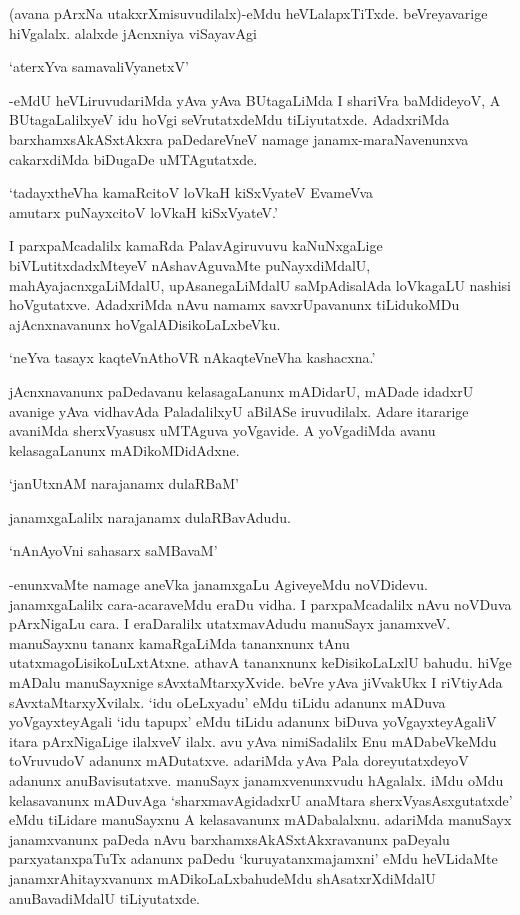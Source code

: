 (avana pArxNa utakxrXmisuvudilalx)-eMdu heVLalapxTiTxde. beVreyavarige hiVgalalx. alalxde jAcnxniya viSayavAgi

\begin{shloka}
`aterxYva samavaliVyanetxV'
\end{shloka}

-eMdU heVLiruvudariMda yAva yAva BUtagaLiMda I shariVra baMdideyoV, A BUtagaLalilxyeV idu hoVgi seVrutatxdeMdu tiLiyutatxde. AdadxriMda barxhamxsAkASxtAkxra paDedareVneV namage janamx-maraNavenunxva cakarxdiMda biDugaDe uMTAgutatxde.

\begin{shloka}
`tadayxtheVha kamaRcitoV loVkaH kiSxVyateV EvameVva\\
amutarx puNayxcitoV loVkaH kiSxVyateV.'
\end{shloka}

I parxpaMcadalilx kamaRda PalavAgiruvuvu kaNuNxgaLige biVLutitxdadxMteyeV nAshavAguvaMte puNayxdiMdalU, mahAyajacnxgaLiMdalU, upAsanegaLiMdalU saMpAdisalAda loVkagaLU nashisi hoVgutatxve. AdadxriMda nAvu namamx savxrUpavanunx tiLidukoMDu ajAcnxnavanunx hoVgalADisikoLaLxbeVku.

\begin{shloka}
`neYva tasayx kaqteVnAthoVR nAkaqteVneVha kashacxna.'
\end{shloka}

jAcnxnavanunx paDedavanu kelasagaLanunx mADidarU, mADade idadxrU avanige yAva vidhavAda PaladalilxyU aBilASe iruvudilalx. Adare itararige avaniMda sherxVyasusx uMTAguva yoVgavide. A yoVgadiMda avanu kelasagaLanunx mADikoMDidAdxne.

\begin{shloka}
`janUtxnAM narajanamx dulaRBaM'
\end{shloka}

janamxgaLalilx narajanamx dulaRBavAdudu.

\begin{shloka}
`nAnAyoVni sahasarx saMBavaM'
\end{shloka}

-enunxvaMte namage aneVka janamxgaLu AgiveyeMdu noVDidevu. janamxgaLalilx cara-acaraveMdu eraDu vidha. I parxpaMcadalilx nAvu noVDuva pArxNigaLu cara. I eraDaralilx utatxmavAdudu manuSayx janamxveV. manuSayxnu tananx kamaRgaLiMda tananxnunx tAnu utatxmagoLisikoLuLxtAtxne. athavA tananxnunx keDisikoLaLxlU bahudu. hiVge mADalu manuSayxnige sAvxtaMtarxyXvide. beVre yAva jiVvakUkx I riVtiyAda sAvxtaMtarxyXvilalx. `idu oLeLxyadu' eMdu tiLidu adanunx mADuva yoVgayxteyAgali `idu tapupx' eMdu tiLidu adanunx biDuva yoVgayxteyAgaliV itara pArxNigaLige ilalxveV ilalx. avu yAva nimiSadalilx Enu mADabeVkeMdu toVruvudoV adanunx mADutatxve. adariMda yAva Pala doreyutatxdeyoV adanunx anuBavisutatxve. manuSayx janamxvenunxvudu hAgalalx. iMdu oMdu kelasavanunx mADuvAga `sharxmavAgidadxrU anaMtara sherxVyasAsxgutatxde' eMdu tiLidare manuSayxnu A kelasavanunx mADabalalxnu. adariMda manuSayx janamxvanunx paDeda nAvu barxhamxsAkASxtAkxravanunx paDeyalu parxyatanxpaTuTx adanunx paDedu `kuruyatanxmajamxni' eMdu heVLidaMte janamxrAhitayxvanunx mADikoLaLxbahudeMdu shAsatxrXdiMdalU anuBavadiMdalU tiLiyutatxde.

